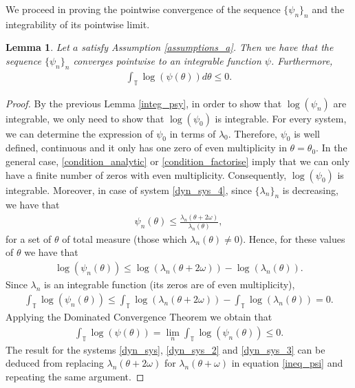 \documentclass[12pt]{article}
\newcommand{\T}{\mathbb{T}}
\theoremstyle{plain}
\newtheorem{lemma}[defn]{Lemma}
\theoremstyle{remark}
\theoremstyle{definition}
\begin{document}
We proceed in proving the pointwise convergence of the sequence $\{\psi_n\}_n$ and the integrability of its pointwise limit.
\begin{lemma}\label{lem_int_psi}
    Let $a$ satisfy Assumption \eqref{assumptions_a}. Then we have that the sequence $\{\psi_n\}_n$ converges pointwise to an integrable function $\psi$. Furthermore,
    \begin{align*}
        \int_\T \log(\psi(\theta))d\theta \leq 0.
    \end{align*}
\end{lemma}
\begin{proof}
    By the previous Lemma \ref{integ_psy}, in order to show that $\log(\psi_n)$ are integrable, we only need to show that $\log(\psi_0)$ is integrable. For every system, we can determine the expression of $\psi_0$ in terms of $\lambda_0$.
    Therefore, $\psi_0$ is well defined, continuous and it only has one zero of even multiplicity in $\theta=\theta_0$. In the general case, \ref{condition_analytic} or \ref{condition_factorise} imply that we can only have a finite number of zeros with even multiplicity. Consequently, $\log(\psi_0)$ is integrable. Moreover, in case of system \eqref{dyn_sys_4}, since $\{\lambda_{n}\}_n$ is decreasing, we have that
    \begin{align}\label{ineq_psi}
        \psi_n(\theta)\leq \frac{\lambda_{n}(\theta+2\omega)}{\lambda_n(\theta)},
    \end{align}
    for a set of $\theta$ of total measure (those which $\lambda_n(\theta)\not=0$). Hence, for these values of $\theta$ we have that
    \begin{align*}
        \log(\psi_n(\theta))\leq \log(\lambda_{n}(\theta+2\omega))-\log(\lambda_n(\theta)).
    \end{align*}
    Since $\lambda_n$ is an integrable function (its zeros are of even multiplicity),
    \begin{align*}
        \int_\T\log(\psi_n(\theta))\leq \int_\T\log(\lambda_{n}(\theta+2\omega))-\int_\T\log(\lambda_n(\theta))=0.
    \end{align*}
    Applying the Dominated Convergence Theorem we obtain that
    \begin{align*}
        \int_\T\log(\psi(\theta)) = \lim_n \int_\T\log(\psi_n(\theta)) \leq 0.
    \end{align*}
    The result for the systems \eqref{dyn_sys}, \eqref{dyn_sys_2} and \eqref{dyn_sys_3} can be deduced from replacing $\lambda_{n}(\theta+2\omega)$ for $\lambda_{n}(\theta+\omega)$ in equation \eqref{ineq_psi} and repeating the same argument.
\end{proof}
\end{document}
